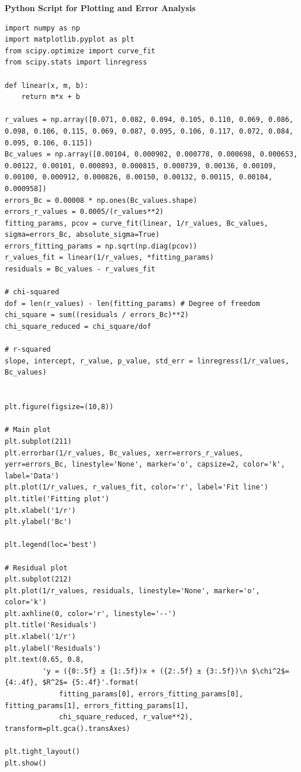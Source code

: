 \documentclass[12pt]{article}
\begin{document}
{\bf Python Script for Plotting and Error Analysis}
\begin{lstlisting}
import numpy as np
import matplotlib.pyplot as plt
from scipy.optimize import curve_fit
from scipy.stats import linregress

def linear(x, m, b):
    return m*x + b

r_values = np.array([0.071, 0.082, 0.094, 0.105, 0.110, 0.069, 0.086, 0.098, 0.106, 0.115, 0.069, 0.087, 0.095, 0.106, 0.117, 0.072, 0.084, 0.095, 0.106, 0.115])
Bc_values = np.array([0.00104, 0.000902, 0.000778, 0.000698, 0.000653, 0.00122, 0.00101, 0.000893, 0.000815, 0.000739, 0.00136, 0.00109, 0.00100, 0.000912, 0.000826, 0.00150, 0.00132, 0.00115, 0.00104, 0.000958])
errors_Bc = 0.00008 * np.ones(Bc_values.shape)
errors_r_values = 0.0005/(r_values**2)
fitting_params, pcov = curve_fit(linear, 1/r_values, Bc_values, sigma=errors_Bc, absolute_sigma=True)
errors_fitting_params = np.sqrt(np.diag(pcov))
r_values_fit = linear(1/r_values, *fitting_params)
residuals = Bc_values - r_values_fit

# chi-squared 
dof = len(r_values) - len(fitting_params) # Degree of freedom
chi_square = sum((residuals / errors_Bc)**2)
chi_square_reduced = chi_square/dof

# r-squared 
slope, intercept, r_value, p_value, std_err = linregress(1/r_values, Bc_values)


plt.figure(figsize=(10,8))

# Main plot
plt.subplot(211)
plt.errorbar(1/r_values, Bc_values, xerr=errors_r_values, yerr=errors_Bc, linestyle='None', marker='o', capsize=2, color='k', label='Data')
plt.plot(1/r_values, r_values_fit, color='r', label='Fit line')
plt.title('Fitting plot')
plt.xlabel('1/r')
plt.ylabel('Bc')

plt.legend(loc='best')

# Residual plot
plt.subplot(212)
plt.plot(1/r_values, residuals, linestyle='None', marker='o', color='k')
plt.axhline(0, color='r', linestyle='--')
plt.title('Residuals')
plt.xlabel('1/r')
plt.ylabel('Residuals')
plt.text(0.65, 0.8, 
         'y = ({0:.5f} ± {1:.5f})x + ({2:.5f} ± {3:.5f})\n $\chi^2$= {4:.4f}, $R^2$= {5:.4f}'.format(
             fitting_params[0], errors_fitting_params[0], fitting_params[1], errors_fitting_params[1], 
             chi_square_reduced, r_value**2), transform=plt.gca().transAxes)

plt.tight_layout()
plt.show()
\end{lstlisting}
\end{document}
